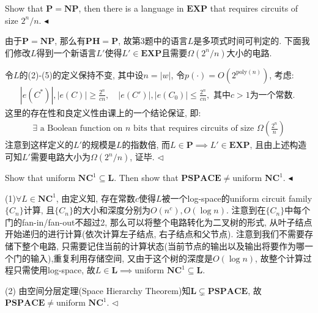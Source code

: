 \documentclass[11pt]{article}
\newcommand{\mP}{\mathbf{P}}
\newcommand{\NP}{\mathbf{NP}}
\newcommand{\PSPACE}{\mathbf{PSPACE}}
\newcommand{\EXP}{\mathbf{EXP}}
\newcommand{\LL}{\mathbf{L}}
\newcommand{\NC}{\mathbf{NC}}
\newcommand{\PH}{\mathbf{PH}}
\newcommand{\1}{\mathbf{1}}
\newenvironment{problem}[2][Problem]{\begin{trivlist}
\item[\hskip \labelsep{\bfseries#1}\hskip\labelsep{\bfseries#2.}]}{\hfill$\blacktriangleleft$\end{trivlist}}
\newenvironment{answer}[1][Answer]{\begin{trivlist}
\item[\hskip \labelsep{\bfseries\itshape#1.}\hskip \labelsep]}{\hfill$\lhd$\end{trivlist}}
\begin{document}
\begin{problem}{4(21 points)}
    Show that $\mP = \NP$, then there is a language in $\EXP$ that requires circuits of size $2^n/n$.
\end{problem}
\begin{answer}
    由于$\mP = \NP$, 那么有$\PH = \mP$, 故第3题中的语言$L$是多项式时间可判定的. 下面我们修改$L$得到一个新语言$L'$使得$L' \in \EXP$且需要$\Omega(2^n/n)$大小的电路. 

    令$L$的(2)-(5)的定义保持不变, 其中设$n = |w|$, 令$p(\cdot) = O(2^{\text{poly}(n)})$, 考虑:
    \begin{align*}
        |e(C^*)|, |e(C)| \ge \frac{2^n}{cn}, \quad |e(C')|, |e(C_0)| \le \frac{2^n}{cn}, \text{ 其中$c>1$为一个常数. }
    \end{align*}
    这里的存在性和良定义性由课上的一个结论保证, 即:
    \begin{align*}
        \text{$\exists$ a Boolean function on $n$ bits that requires circuits of size $\Omega\left(\frac{2^n}{n}\right)$}
    \end{align*}
    注意到这样定义的$L'$的规模是$L$的指数倍, 而$L \in \mP \implies L' \in \EXP$, 且由上述构造可知$L'$需要电路大小为$\Omega(2^n/n)$, 证毕.
\end{answer} 

\begin{problem}{5(21 points)}
    Show that uniform $\NC^1 \subseteq \LL$. Then show that $\PSPACE \neq \text{uniform } \NC^1$. 
\end{problem}
\begin{answer}
   (1)$\forall L \in \NC^1$, 由定义知, 存在常数$c$使得$L$被一个log-space的uniform circuit family $\{C_n\}$计算, 且$\{C_n\}$的大小和深度分别为$O(n^c), O(\log n)$. 注意到在$\{C_n\}$中每个门的fan-in/fan-out不超过2, 那么可以将整个电路转化为二叉树的形式, 从叶子结点开始递归的进行计算(依次计算左子结点, 右子结点和父节点). 注意到我们不需要存储下整个电路, 只需要记住当前的计算状态(当前节点的输出以及输出将要作为哪一个门的输入),重复利用存储空间, 又由于这个树的深度是$O(\log n)$, 故整个计算过程只需使用log-space, 故$L \in \LL \implies \text{uniform }\NC^1 \subseteq \LL$.

   (2) 由空间分层定理(Space Hierarchy Theorem)知$\LL \subsetneq \PSPACE$, 故$\PSPACE \neq \text{uniform } \NC^1$.
\end{answer}
\end{document}
